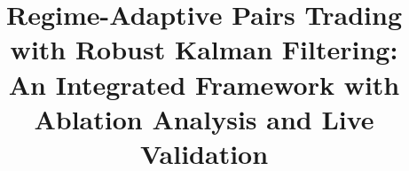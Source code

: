 \documentclass{ieeeaccess}
\begin{document}
\title{Regime-Adaptive Pairs Trading with Robust Kalman Filtering:\\
An Integrated Framework with Ablation Analysis and Live Validation}

\author{
}

\maketitle

\end{document}
